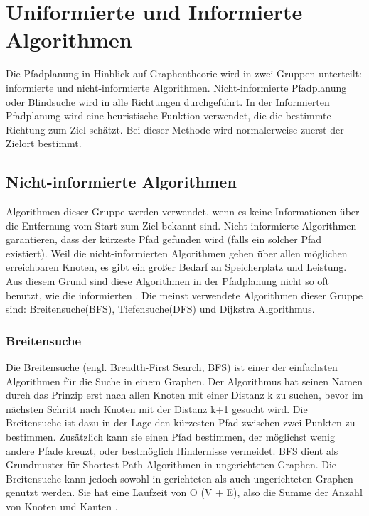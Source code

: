 \chapter{Uniformierte und Informierte Algorithmen}

Die Pfadplanung in Hinblick auf Graphentheorie wird in zwei Gruppen unterteilt: informierte und nicht-informierte Algorithmen. Nicht-informierte Pfadplanung oder Blindsuche wird in alle Richtungen durchgeführt. In der Informierten Pfadplanung wird eine heuristische Funktion verwendet, die die bestimmte Richtung zum Ziel schätzt. Bei dieser Methode wird normalerweise zuerst der Zielort bestimmt\cite{comAnal}.

\section{Nicht-informierte Algorithmen}
Algorithmen dieser Gruppe werden verwendet, wenn es keine Informationen über die Entfernung vom Start zum Ziel bekannt sind. Nicht-informierte Algorithmen garantieren, dass der kürzeste Pfad gefunden wird (falls ein solcher Pfad existiert)\cite{comAnal}. Weil die nicht-informierten Algorithmen gehen über allen möglichen erreichbaren Knoten, es gibt ein großer Bedarf an Speicherplatz und Leistung. Aus diesem Grund sind diese Algorithmen in der Pfadplanung nicht so oft benutzt, wie die informierten\cite{sim} \cite{comAnal}. Die meinst verwendete Algorithmen dieser Gruppe sind: Breitensuche(BFS), Tiefensuche(DFS) und Dijkstra Algorithmus.

\subsection{Breitensuche}

Die Breitensuche (engl. Breadth-First Search, BFS) ist einer der einfachsten Algorithmen für die Suche in einem Graphen. Der Algorithmus hat seinen Namen durch das Prinzip erst nach allen Knoten mit einer Distanz k zu suchen, bevor im nächsten Schritt nach Knoten mit der Distanz k+1 gesucht wird\cite{Cormen.2009}. Die Breitensuche ist dazu in der Lage den kürzesten Pfad zwischen zwei Punkten zu bestimmen. Zusätzlich kann sie einen Pfad bestimmen, der möglichst wenig andere Pfade kreuzt, oder bestmöglich Hindernisse vermeidet\cite{Lee.1961}. BFS dient als Grundmuster für Shortest Path Algorithmen in ungerichteten Graphen\cite{Ottmann.2017}. Die Breitensuche kann jedoch sowohl in gerichteten als auch ungerichteten Graphen genutzt werden. Sie hat eine Laufzeit von O (V + E), also die Summe der Anzahl von Knoten und Kanten \cite{Cormen.2009}. \newline

